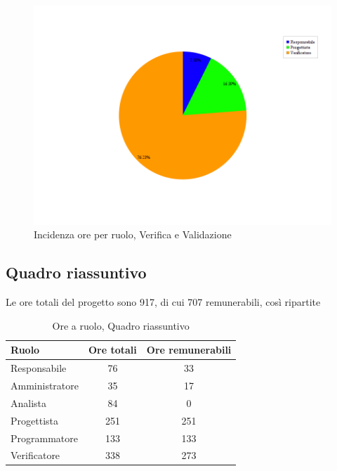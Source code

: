 \begin{figure}[H]
	\centering
	\includegraphics[scale=0.3]{immagini/Grafi/OreRuoloVerifica}
	\caption{Incidenza ore per ruolo, Verifica e Validazione}
\end{figure}

\subsection{Quadro riassuntivo}
Le ore totali del progetto sono 917, di cui 707 remunerabili, così ripartite
\begin{table}[H]
	\begin{center}
		\begin{tabular}{|l|c|c|}
			\hline
			\textbf{Ruolo}	& \textbf{Ore totali} & \textbf{Ore remunerabili} \\
			\hline
			Responsabile	&	76	&	33	\\
			\hline
			Amministratore	&	35	&	17	\\
			\hline
			Analista		&	84	&	0	\\
			\hline
			Progettista		&	251	&	251	\\
			\hline
			Programmatore	&	133	&	133	\\
			\hline
			Verificatore	&	338	&	273	\\
			\hline
		\end{tabular}
	\end{center}
	\caption{Ore a ruolo, Quadro riassuntivo}
\end{table}

